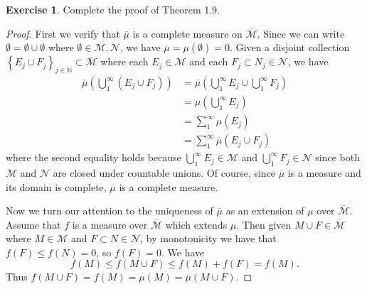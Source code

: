 \documentclass{article}
\theoremstyle{definition}
\newtheorem{ex}{Exercise}
\begin{document}
\begin{ex}
	Complete the proof of Theorem 1.9.
\end{ex}
\begin{proof}
	First we verify that $\overline{\mu}$ is a complete measure on $\overline{\mathscr{M}}$.
	Since we can write $\emptyset = \emptyset \cup \emptyset$ where $\emptyset \in \mathscr{M}, \mathscr{N}$, we have $\overline{\mu} = \mu(\emptyset) = 0$.
	Given a disjoint collection $\left\lbrace E_j \cup F_j \right\rbrace_{j \in \mathbb{N}} \subset \overline{\mathscr{M}}$ where each $E_j \in \mathscr{M}$ and each $F_j \subset N_j \in \mathscr{N}$, we have \begin{align*}
		\overline{\mu} \left( \bigcup _{1}^{\infty} \left( E_j \cup F_j \right) \right) & = \overline{\mu} \left( \bigcup _{1}^{\infty} E_j \cup \bigcup _{1}^{\infty} F_j \right) \\
		                                                                                & = \mu \left( \bigcup _{1}^{\infty}E_j \right)                                            \\
		                                                                                & = \sum _{1}^{\infty} \mu \left( E_j \right)                                              \\
		                                                                                & = \sum _{1}^{\infty} \overline{\mu} \left( E_j \cup F_j \right)
	\end{align*}
	where the second equality holds because $\bigcup _{1}^{\infty} E_j \in \mathscr{M}$ and $\bigcup _{1}^{\infty}F_j \in \mathscr{N}$ since both $\mathscr{M}$ and $\mathscr{N}$ are closed under countable unions.
	Of course, since $\overline{\mu}$ is a measure and its domain is complete, $\overline{\mu}$ is a complete measure.

	Now we turn our attention to the uniqueness of $\overline{\mu}$ as an extension of $\mu$ over $\overline{\mathscr{M}}$.
	Assume that $f$ is a measure over $\overline{\mathscr{M}}$ which extends $\mu$.
	Then given $M \cup F \in \overline{\mathscr{M}}$ where $M \in \mathscr{M}$ and $F \subset N \in \mathscr{N}$, by monotonicity we have that $f(F) \leq f(N) = 0$, so $f(F) = 0$.
	We have \begin{equation*}
		f(M) \leq f \left( M \cup F \right) \leq f(M) + f(F) = f(M).
	\end{equation*}
	Thus $f(M \cup F) = f(M) = \mu(M) = \overline{\mu}(M \cup F)$.
\end{proof}
\end{document}

